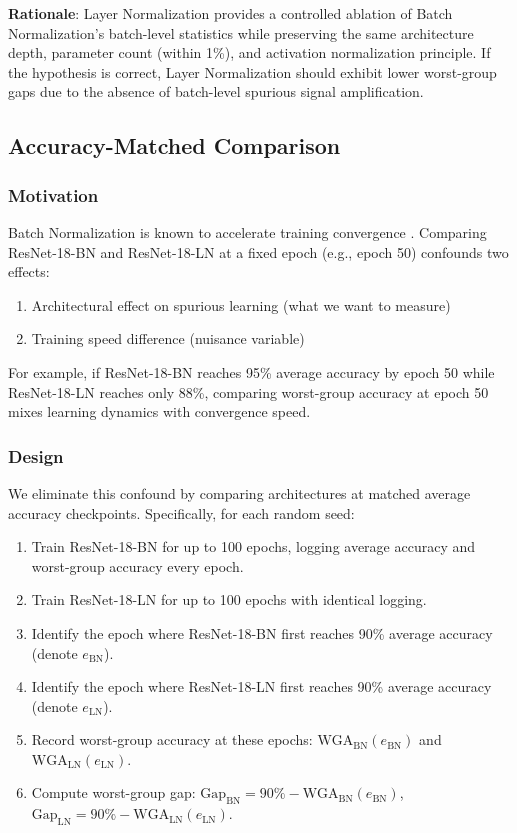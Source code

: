 \textbf{Rationale}: Layer Normalization provides a controlled ablation of Batch Normalization's batch-level statistics while preserving the same architecture depth, parameter count (within 1\%), and activation normalization principle. If the hypothesis is correct, Layer Normalization should exhibit lower worst-group gaps due to the absence of batch-level spurious signal amplification.

\subsection{Accuracy-Matched Comparison}

\subsubsection{Motivation}

Batch Normalization is known to accelerate training convergence \cite{santurkar2018does}. Comparing ResNet-18-BN and ResNet-18-LN at a fixed epoch (e.g., epoch 50) confounds two effects:
\begin{enumerate}
\item Architectural effect on spurious learning (what we want to measure)
\item Training speed difference (nuisance variable)
\end{enumerate}

For example, if ResNet-18-BN reaches 95\% average accuracy by epoch 50 while ResNet-18-LN reaches only 88\%, comparing worst-group accuracy at epoch 50 mixes learning dynamics with convergence speed.

\subsubsection{Design}

We eliminate this confound by comparing architectures at matched average accuracy checkpoints. Specifically, for each random seed:

\begin{enumerate}
\item Train ResNet-18-BN for up to 100 epochs, logging average accuracy and worst-group accuracy every epoch.
\item Train ResNet-18-LN for up to 100 epochs with identical logging.
\item Identify the epoch where ResNet-18-BN first reaches 90\% average accuracy (denote $e_{\text{BN}}$).
\item Identify the epoch where ResNet-18-LN first reaches 90\% average accuracy (denote $e_{\text{LN}}$).
\item Record worst-group accuracy at these epochs: $\text{WGA}_{\text{BN}}(e_{\text{BN}})$ and $\text{WGA}_{\text{LN}}(e_{\text{LN}})$.
\item Compute worst-group gap: $\text{Gap}_{\text{BN}} = 90\% - \text{WGA}_{\text{BN}}(e_{\text{BN}})$, $\text{Gap}_{\text{LN}} = 90\% - \text{WGA}_{\text{LN}}(e_{\text{LN}})$.
\end{enumerate}

